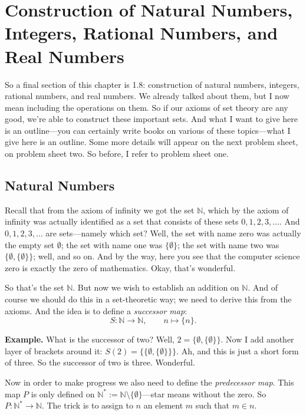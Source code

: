 \section{Construction of Natural Numbers, Integers, Rational Numbers, and Real Numbers}

So a final section of this chapter is 1.8: construction of natural numbers, integers, rational numbers, and real numbers. We already talked about them, but I now mean including the operations on them. So if our axioms of set theory are any good, we're able to construct these important sets. And what I want to give here is an outline---you can certainly write books on various of these topics---what I give here is an outline. Some more details will appear on the next problem sheet, on problem sheet two. So before, I refer to problem sheet one.

\subsection*{Natural Numbers}

Recall that from the axiom of infinity we got the set $\mathbb{N}$, which by the axiom of infinity was actually identified as a set that consists of these sets $0, 1, 2, 3, \ldots$. And $0, 1, 2, 3, \ldots$ are sets---namely which set? Well, the set with name zero was actually the empty set $\emptyset$; the set with name one was $\{\emptyset\}$; the set with name two was $\{\emptyset, \{\emptyset\}\}$; well, and so on. And by the way, here you see that the computer science zero is exactly the zero of mathematics. Okay, that's wonderful.

So that's the set $\mathbb{N}$. But now we wish to establish an addition on $\mathbb{N}$. And of course we should do this in a set-theoretic way; we need to derive this from the axioms. And the idea is to define a \emph{successor map}:
\[
S : \mathbb{N} \to \mathbb{N}, \qquad n \mapsto \{n\}.
\]

\textbf{Example.} What is the successor of two? Well, $2 = \{\emptyset, \{\emptyset\}\}$. Now I add another layer of brackets around it: $S(2) = \{\{\emptyset, \{\emptyset\}\}\}$. Ah, and this is just a short form of three. So the successor of two is three. Wonderful.

Now in order to make progress we also need to define the \emph{predecessor map}. This map $P$ is only defined on $\mathbb{N}^* := \mathbb{N} \setminus \{\emptyset\}$---star means without the zero. So $P : \mathbb{N}^* \to \mathbb{N}$. The trick is to assign to $n$ an element $m$ such that $m \in n$.

